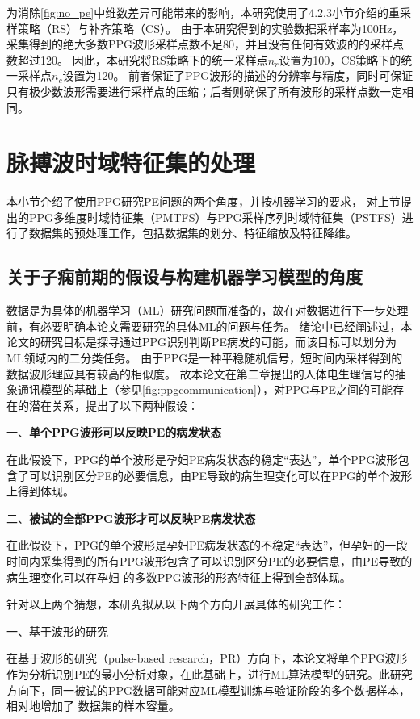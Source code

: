 为消除\autoref{fig:no_pe}中维数差异可能带来的影响，本研究使用了4.2.3小节介绍的重采样策略（RS）与补齐策略（CS）。
由于本研究得到的实验数据采样率为100Hz，采集得到的绝大多数PPG波形采样点数不足80，并且没有任何有效波的的采样点数超过120。
因此，本研究将RS策略下的统一采样点$n_r$设置为100，CS策略下的统一采样点$n_c$设置为120。
前者保证了PPG波形的描述的分辨率与精度，同时可保证只有极少数波形需要进行采样点的压缩；后者则确保了所有波形的采样点数一定相同。

\section{脉搏波时域特征集的处理}
本小节介绍了使用PPG研究PE问题的两个角度，并按机器学习的要求，
对上节提出的PPG多维度时域特征集（PMTFS）与PPG采样序列时域特征集（PSTFS）进行了数据集的预处理工作，包括数据集的划分、特征缩放及特征降维。

\subsection{关于子痫前期的假设与构建机器学习模型的角度}
数据是为具体的机器学习（ML）研究问题而准备的，故在对数据进行下一步处理前，有必要明确本论文需要研究的具体ML的问题与任务。
绪论中已经阐述过，本论文的研究目标是探寻通过PPG识别判断PE病发的可能，而该目标可以划分为ML领域内的二分类任务。
由于PPG是一种平稳随机信号，短时间内采样得到的数据波形理应具有较高的相似度\cite{Qiu2012,PPGYY,Ma2015}。
故本论文在第二章提出的人体电生理信号的抽象通讯模型的基础上（参见\autoref{fig:ppgcommunication}），对PPG与PE之间的可能存在的潜在关系，提出了以下两种假设：

一、\textbf{单个PPG波形可以反映PE的病发状态}

在此假设下，PPG的单个波形是孕妇PE病发状态的稳定“表达”，单个PPG波形包含了可以识别区分PE的必要信息，由PE导致的病生理变化可以在PPG的单个波形上得到体现。

二、\textbf{被试的全部PPG波形才可以反映PE病发状态}

在此假设下，PPG的单个波形是孕妇PE病发状态的不稳定“表达”，但孕妇的一段时间内采集得到的所有PPG波形包含了可以识别区分PE的必要信息，由PE导致的病生理变化可以在孕妇
的多数PPG波形的形态特征上得到全部体现。

针对以上两个猜想，本研究拟从以下两个方向开展具体的研究工作：

一、基于波形的研究

在基于波形的研究（pulse-based research，PR）方向下，本论文将单个PPG波形作为分析识别PE的最小分析对象，在此基础上，进行ML算法模型的研究。此研究方向下，同一被试的PPG数据可能对应ML模型训练与验证阶段的多个数据样本，相对地增加了
数据集的样本容量。

